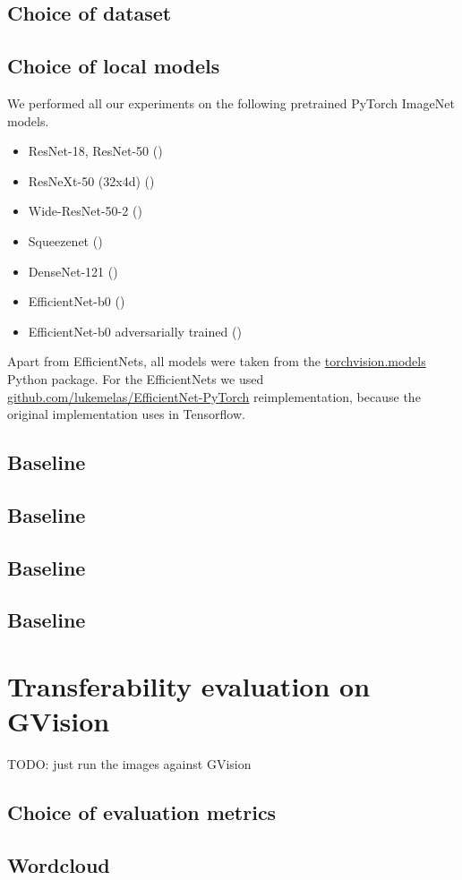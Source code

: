 \subsection{Choice of dataset}

\subsection{Choice of local models}
We performed all our experiments on the following pretrained PyTorch ImageNet models.

\begin{itemize}
    \item ResNet-18, ResNet-50 (\cite{he2015deep})
    \item ResNeXt-50 (32x4d) (\cite{xie2017aggregated})
    \item Wide-ResNet-50-2 (\cite{zagoruyko2017wide})
    \item Squeezenet (\cite{iandola2016squeezenet})
    \item DenseNet-121 (\cite{huang2018densely})
    \item EfficientNet-b0 (\cite{tan2020efficientnet})
    \item EfficientNet-b0 adversarially trained (\cite{tramer2020ensemble})
\end{itemize}


Apart from EfficientNets, all models were taken from the \href{https://pytorch.org/vision/stable/models.html}{torchvision.models} Python package. For the EfficientNets we used \href{https://github.com/lukemelas/EfficientNet-PyTorch}{github.com/lukemelas/EfficientNet-PyTorch} reimplementation, because the original implementation uses in Tensorflow.

\subsection{Baseline}
\subsection{Baseline}
\subsection{Baseline}
\subsection{Baseline}

\section{Transferability evaluation on GVision}
TODO: just run the images against GVision

\subsection{Choice of evaluation metrics}

\subsection{Wordcloud}
